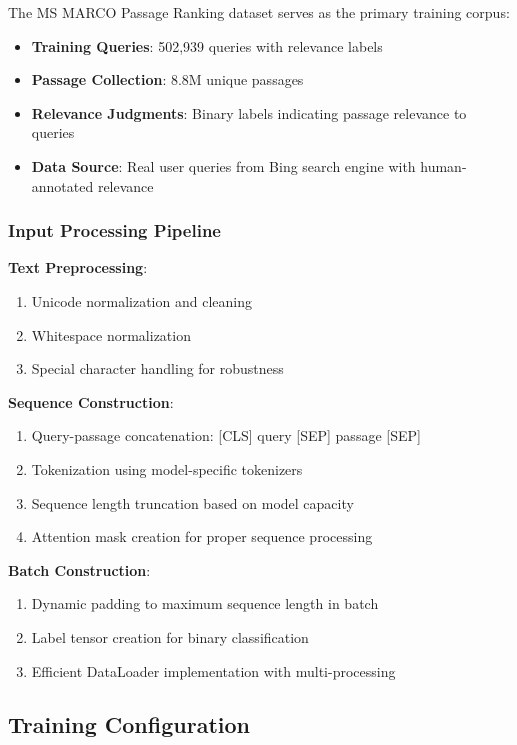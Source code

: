 The MS MARCO Passage Ranking dataset \cite{DBLP:journals/corr/NguyenRSGTMD16} serves as the primary training corpus:

\begin{itemize}
    \item \textbf{Training Queries}: 502,939 queries with relevance labels
    \item \textbf{Passage Collection}: 8.8M unique passages
    \item \textbf{Relevance Judgments}: Binary labels indicating passage relevance to queries
    \item \textbf{Data Source}: Real user queries from Bing search engine with human-annotated relevance
\end{itemize}

\subsubsection{Input Processing Pipeline}

\textbf{Text Preprocessing}:
\begin{enumerate}
    \item Unicode normalization and cleaning
    \item Whitespace normalization
    \item Special character handling for robustness
\end{enumerate}

\textbf{Sequence Construction}:
\begin{enumerate}
    \item Query-passage concatenation: [CLS] query [SEP] passage [SEP]
    \item Tokenization using model-specific tokenizers
    \item Sequence length truncation based on model capacity
    \item Attention mask creation for proper sequence processing
\end{enumerate}

\textbf{Batch Construction}:
\begin{enumerate}
    \item Dynamic padding to maximum sequence length in batch
    \item Label tensor creation for binary classification
    \item Efficient DataLoader implementation with multi-processing
\end{enumerate}

\subsection{Training Configuration}

